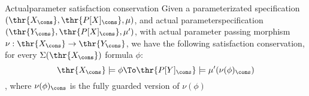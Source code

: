 







\begin{proposition}{Actualparameter satisfaction conservation}
\label{prop:actparasat}
Given a parameterizated specification
	$(\thr{X_\cons}, \thr{P[X]_\cons}, \mu)$, and actual parameterspecification $(\thr{Y_\cons}, \thr{P[X]_\cons}, \mu')$, with actual parameter passing morphism $\nu: \thr{X_\cons} \to \thr{Y_\cons}$, we have the following
	satisfaction conservation, for every $\Sigma(\thr{X_\cons})$ formula $\phi$:
	\[ \thr{X_\cons} \models \phi \To \thr{P[Y]_\cons} \models \mu'(\nu(\phi)_\cons) \]
, where $\nu(\phi)_\cons$ is the fully guarded version of $\nu(\phi)$
\end{proposition}

